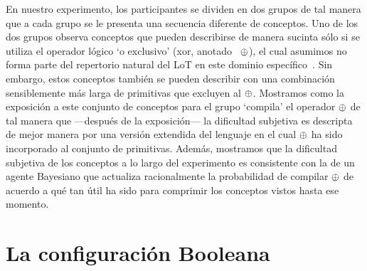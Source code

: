 
En nuestro experimento, los participantes se dividen en dos grupos de tal manera que a cada grupo se le presenta una secuencia diferente de conceptos. Uno de los dos grupos observa conceptos que pueden describirse de manera sucinta sólo si se utiliza el operador lógico `o exclusivo' (xor, anotado ~$\oplus$), el cual asumimos no forma parte del repertorio natural del LoT en este dominio específico~\cite{piantadosi2016logical}. Sin embargo, estos conceptos también se pueden describir con una combinación sensiblemente más larga de primitivas que excluyen al $\oplus$. Mostramos como la exposición a este conjunto de conceptos para el grupo `compila' el operador $\oplus$ de tal manera que ---después de la exposición--- la dificultad subjetiva es descripta de mejor manera por una versión extendida del lenguaje en el cual $\oplus$ ha sido incorporado al conjunto de primitivas. Además, mostramos que la dificultad subjetiva de los conceptos a lo largo del experimento es consistente con la de un agente Bayesiano que actualiza racionalmente la probabilidad de compilar $\oplus$ de acuerdo a qué tan útil ha sido para comprimir los conceptos vistos hasta ese momento.

\section{La configuración Booleana}


